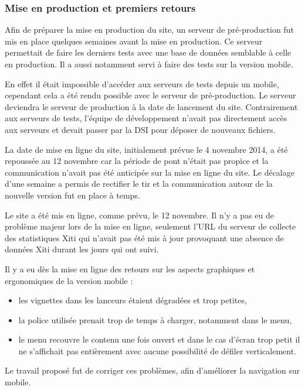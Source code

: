 \documentclass[12pt,a4paper]{article}
\begin{document}
\subsubsection{Mise en production et premiers retours}
Afin de préparer la mise en production du site, un serveur de pré-production fut mis en place quelques semaines avant la mise en production. Ce serveur permettait de faire les derniers tests avec une base de données semblable à celle en production. Il a aussi notamment servi à faire des tests sur la version mobile.\par 
En effet il était impossible d'accéder aux serveurs de tests depuis un mobile, cependant cela a été rendu possible avec le serveur de pré-production. Le serveur deviendra le serveur de production à la date de lancement du site. Contrairement aux serveurs de tests, l'équipe de développement n'avait pas directement accès aux serveurs et devait passer par la DSI pour déposer de nouveaux fichiers.\par 
\bigskip
La date de mise en ligne du site, initialement prévue le 4 novembre 2014, a été repoussée au 12 novembre car la période de pont n'était pas propice et la communication n'avait pas été anticipée sur la mise en ligne du site. Le décalage d'une semaine a permis de rectifier le tir et la communication autour de la nouvelle version fut en place à temps.\par
Le site a été mis en ligne, comme prévu, le 12 novembre. Il n'y a pas eu de problème majeur lors de la mise en ligne, seulement l'URL du serveur de collecte des statistiques Xiti qui n'avait pas été mis à jour provoquant une absence de données Xiti durant les jours qui ont suivi.\par 
Il y a eu dès la mise en ligne des retours sur les aspects graphiques et ergonomiques de la version mobile :
\begin{itemize}
\item les vignettes dans les lanceurs étaient dégradées et trop petites,
\item la police utilisée prenait trop de temps à charger, notamment dans le menu,
\item le menu recouvre le contenu une fois ouvert et dans le cas d'écran trop petit il ne s'affichait pas entièrement avec aucune possibilité de défiler verticalement.
\end{itemize}
Le travail proposé fut de corriger ces problèmes, afin d'améliorer la navigation sur mobile.
\end{document}
